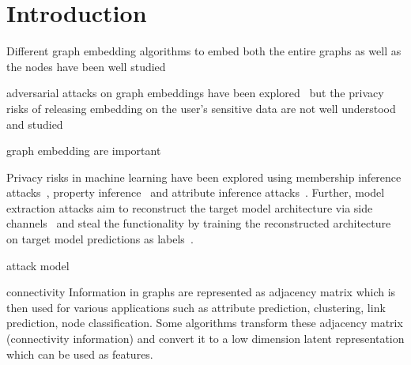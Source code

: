 \section{Introduction}\label{introduction}

Different graph embedding algorithms to embed both the entire graphs as well as the nodes have been well studied~\cite{node2vec,deepwalk,line,sdme,graph2vec,harp}

adversarial attacks on graph embeddings have been explored~\cite{nodepoison} but the privacy risks of releasing embedding on the user's sensitive data are not well understood and studied

graph embedding are important~\cite{tutorial}


Privacy risks in machine learning have been explored using membership inference attacks~\cite{membershipinf}, property inference~\cite{propertyinf} and attribute inference attacks~\cite{attributeinf,attributeinf2,overlearninginf}.
Further, model extraction attacks aim to reconstruct the target model architecture via side channels~\cite{csinn,timing} and steal the functionality by training the reconstructed architecture on target model predictions as labels~\cite{stealml}.

attack model~\cite{gae,vgae}

connectivity Information in graphs are represented as adjacency matrix which is then used for various applications such as attribute prediction, clustering, link prediction, node classification.
Some algorithms transform these adjacency matrix (connectivity information) and convert it to a low dimension latent representation which can be used as features.
